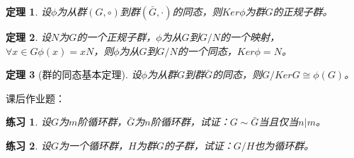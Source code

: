 \documentclass{article}
\newtheorem{Thm}{定理}
\newtheorem{Exercise}{练习}
\begin{document}
\begin{CJK*}{UTF8}{gbsn}
\begin{Thm}
  设$\phi$为从群$(G,\circ)$到群$(\bar{G},\cdot)$的同态，则$Ker \phi$为群$G$的正规子群。
\end{Thm}

\begin{Thm}
设$N$为$G$的一个正规子群，$\phi$为从$G$到$G/N$的一个映射，$\forall x\in G \phi(x)=xN$，则$\phi$为从$G$到$G/N$的一个同态，$Ker \phi=N$。
\end{Thm}

\begin{Thm}[群的同态基本定理]
设$\phi$为从群$G$到群$\bar{G}$的同态，则$G/Ker G \cong \phi(G)$。
\end{Thm}

课后作业题：
\begin{Exercise}
设$G$为$m$阶循环群，$\bar{G}$为$n$阶循环群，试证：$G \sim \bar{G}$当且仅当$n | m$。
\end{Exercise}

\begin{Exercise}
设$G$为一个循环群，$H$为群$G$的子群，试证：$G/H$也为循环群。
\end{Exercise}
\end{CJK*}
\end{document}
